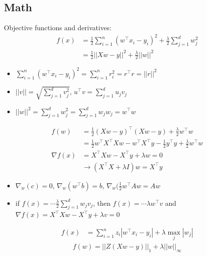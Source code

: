 \documentclass[10pt,landscape,a4paper]{article}
\begin{document}
\begin{multicols*}{5}
\section{Math}
Objective functions and derivatives:
\begin{align*}
   f(x) &= \frac{1}{2}\sum\limits_{i=1}^{n} (w^\intercal x_i - y_i)^2 + \frac{\lambda}{2} \sum\limits_{j=1}^{d} w_j^2 \\
   &= \frac{1}{2} ||Xw-y||^2 + \frac{\lambda}{2} ||w||^2
\end{align*}
\begin{itemize}
    \item \(\sum\limits_{i=1}^{n} (w^\intercal x_i - y_i)^2 = \sum\limits_{i=1}^{n} r_i^2 = r^\intercal r = ||r||^2\)
    \item \(||v|| = \sqrt{\sum\limits_{j=1}^{d} v_j^2}\), \(u^\intercal v = \sum\limits_{j=1}^{d} u_j v_j\)
    \item \(||w||^2 = \sum\limits_{j=1}^{d} w_j^2 = \sum\limits_{j=1}^{d} w_j w_j = w^\intercal w \)
\end{itemize}
\begin{align*}
    f(w) &= \frac{1}{2} (Xw-y)^\intercal (Xw-y) + \frac{\lambda}{2} w^\intercal w \\
    &= \frac{1}{2} w^\intercal X^\intercal Xw - w^\intercal X^\intercal y - \frac{1}{2} y^\intercal y + \frac{\lambda}{2} w^\intercal w \\
    \nabla f(x) &= X^\intercal Xw - X^\intercal y + \lambda w = 0 \\
    & \rightarrow (X^\intercal X + \lambda I) w = X^\intercal y
\end{align*}
\begin{itemize}
    \item \(\nabla_w (c) = 0\), \(\nabla_w (w^\intercal b) = b\), \(\nabla_w (\frac{1}{2} w^\intercal A w = Aw\)
\end{itemize}
\begin{itemize}
    \item if \(f(x) = \cdots \frac{\lambda}{2} \sum\limits_{j=1}^{d} w_j v_j\), then \(f(x) = \cdots \lambda w^\intercal v\) and \(\nabla f(x) = X^\intercal Xw - X^\intercal y + \lambda v = 0\)
\end{itemize}
\begin{align*}
    f(x) &= \sum\limits_{i=1}^{n} z_i |w^\intercal x_i - y_i| + \lambda \max_j |w_j|
\end{align*}
\begin{align*}
    f(w) = ||Z(Xw - y)||_1 + \lambda ||w||_{\infty}
\end{align*}

\end{multicols*}
\end{document}
